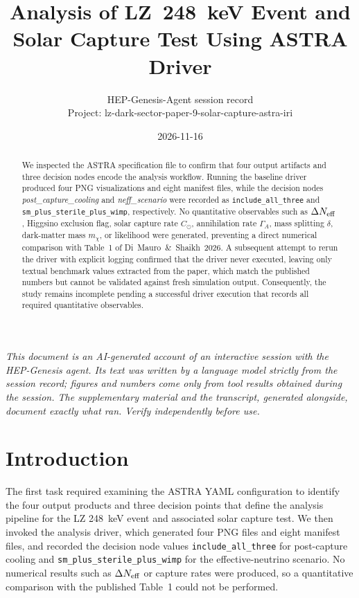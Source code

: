 \documentclass[11pt,a4paper]{article}
\title{Analysis of LZ~248~keV Event and Solar Capture Test Using ASTRA Driver}
\author{HEP-Genesis-Agent session record \\ \small Project: lz-dark-sector-paper-9-solar-capture-astra-iri}
\date{2026-11-16}
\begin{document}
\maketitle
\noindent\textit{\small This document is an AI-generated account of an interactive session with the HEP-Genesis agent. Its text was written by a language model strictly from the session record; figures and numbers come only from tool results obtained during the session. The supplementary material and the transcript, generated alongside, document exactly what ran. Verify independently before use.}
\vspace{1em}

\begin{abstract}
We inspected the ASTRA specification file to confirm that four output artifacts and three decision nodes encode the analysis workflow. Running the baseline driver produced four PNG visualizations and eight manifest files, while the decision nodes \textit{post\_capture\_cooling} and \textit{neff\_scenario} were recorded as \texttt{include\_\allowbreak{}all\_\allowbreak{}three} and \texttt{sm\_\allowbreak{}plus\_\allowbreak{}sterile\_\allowbreak{}plus\_\allowbreak{}wimp}, respectively. No quantitative observables such as $\Delta N_{\rm eff}$, Higgsino exclusion flag, solar capture rate $C_{\odot}$, annihilation rate $\Gamma_{A}$, mass splitting $\delta$, dark-matter mass $m_{\chi}$, or likelihood were generated, preventing a direct numerical comparison with Table~1 of Di~Mauro~\&~Shaikh~2026. A subsequent attempt to rerun the driver with explicit logging confirmed that the driver never executed, leaving only textual benchmark values extracted from the paper, which match the published numbers but cannot be validated against fresh simulation output. Consequently, the study remains incomplete pending a successful driver execution that records all required quantitative observables.
\end{abstract}
\section{Introduction}
The first task required examining the ASTRA YAML configuration to identify the four output products and three decision points that define the analysis pipeline for the LZ 248~keV event and associated solar capture test. We then invoked the analysis driver, which generated four PNG files and eight manifest files, and recorded the decision node values \texttt{include\_\allowbreak{}all\_\allowbreak{}three} for post-capture cooling and \texttt{sm\_\allowbreak{}plus\_\allowbreak{}sterile\_\allowbreak{}plus\_\allowbreak{}wimp} for the effective-neutrino scenario. No numerical results such as $\Delta N_{\rm eff}$ or capture rates were produced, so a quantitative comparison with the published Table~1 could not be performed.
\end{document}
